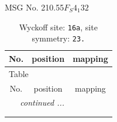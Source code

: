 \documentclass[fleqn,8pt]{jsarticle}
\begin{document}
\setcounter{MaxMatrixCols}{32}

\renewcommand{\tablename}{Table~}
\renewcommand{\figurename}{Figure~}
\begin{center}
\LARGE
MSG No. 210.55\quad$F_{S}4_{1}32$
\end{center}
\renewcommand{\arraystretch}{1.2}
\begin{longtable}{ccc}
\caption{Wyckoff site: {\tt 16a}, site symmetry: {\tt 23.}}
 \\
 \hline \hline
No. & position & mapping \\ \hline \endfirsthead

\multicolumn{2}{l}{\tablename\ \thetable{}} \\
 \hline \hline
No. & position & mapping \\ \hline \endhead

 \hline \hline
\multicolumn{2}{r}{\footnotesize\it continued ...} \\ \endfoot

 \hline \hline
\multicolumn{2}{r}{} \\ \endlastfoot


\end{longtable}
\end{document}
